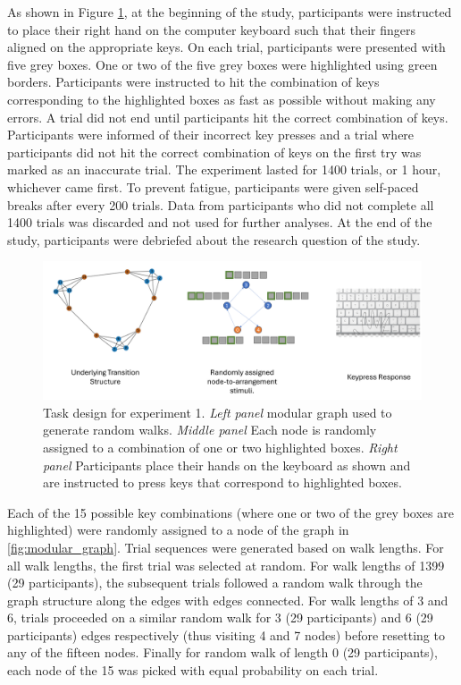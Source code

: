 As shown in Figure \ref{fig:exp1-design}, at the beginning of the study, participants were instructed to place their right hand on the computer keyboard such that their fingers aligned on the appropriate keys. On each trial, participants were presented with five grey boxes. One or two of the five grey boxes were highlighted using green borders. Participants were instructed to hit the combination of keys  corresponding to the highlighted boxes as fast as possible without making any errors. A trial did not end until participants hit the correct combination of keys. Participants were informed of their incorrect key presses and a trial where participants did not hit the correct combination of keys on the first try was marked as an inaccurate trial. The experiment lasted for 1400 trials, or 1 hour, whichever came first. To prevent fatigue, participants were given self-paced breaks after every 200 trials. Data from participants who did not complete all 1400 trials was discarded and not used for further analyses. At the end of the study, participants were debriefed about the research question of the study.

\begin{figure}
	\centering
	\includegraphics[width = \textwidth]{chapter_notebooks/chapter_2/figures/exp1_task_design.png}
	\caption{Task design for experiment 1. \textit{Left panel} modular graph used to generate random walks. \textit{Middle panel} Each node is randomly assigned to a combination of one or two highlighted boxes. \textit{Right panel} Participants place their hands on the keyboard as shown and are instructed to press keys that correspond to highlighted boxes.}
	\label{fig:exp1-design}
\end{figure}

Each of the 15 possible key combinations (where one or two of the grey boxes are highlighted) were randomly assigned to a node of the graph in \ref{fig:modular_graph}. Trial sequences were generated based on walk lengths. For all walk lengths, the first trial was selected at random. For walk lengths of 1399 (29 participants), the subsequent trials followed a random walk through the graph structure along the edges with edges connected. For walk lengths of 3 and 6, trials proceeded on a similar random walk for 3 (29 participants) and 6 (29 participants) edges respectively (thus visiting 4 and 7 nodes) before resetting to any of the fifteen nodes. Finally for random walk of length 0 (29 participants), each node of the 15 was picked with equal probability on each trial. 


